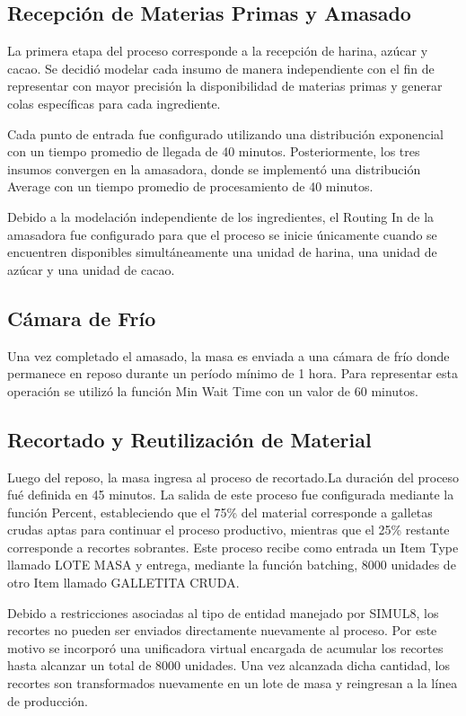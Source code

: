 \documentclass[runningheads]{llncs}
\begin{document}
\subsection{Recepción de Materias Primas y Amasado}

La primera etapa del proceso corresponde a la recepción de harina, azúcar y cacao. Se decidió modelar cada insumo de manera independiente con el fin de representar con mayor precisión la disponibilidad de materias primas y generar colas específicas para cada ingrediente.

Cada punto de entrada fue configurado utilizando una distribución exponencial con un tiempo promedio de llegada de 40 minutos. Posteriormente, los tres insumos convergen en la amasadora, donde se implementó una distribución Average con un tiempo promedio de procesamiento de 40 minutos.

Debido a la modelación independiente de los ingredientes, el Routing In de la amasadora fue configurado para que el proceso se inicie únicamente cuando se encuentren disponibles simultáneamente una unidad de harina, una unidad de azúcar y una unidad de cacao. 

\subsection{Cámara de Frío}

Una vez completado el amasado, la masa es enviada a una cámara de frío donde permanece en reposo durante un período mínimo de 1 hora. Para representar esta operación se utilizó la función Min Wait Time con un valor de 60 minutos.

\subsection{Recortado y Reutilización de Material}

Luego del reposo, la masa ingresa al proceso de recortado.La duración del proceso fué definida en 45 minutos. La salida de este proceso fue configurada mediante la función Percent, estableciendo que el 75\% del material corresponde a galletas crudas aptas para continuar el proceso productivo, mientras que el 25\% restante corresponde a recortes sobrantes. Este proceso recibe como entrada un Item Type llamado LOTE MASA y entrega, mediante la función batching, 8000 unidades de otro Item llamado GALLETITA CRUDA.

Debido a restricciones asociadas al tipo de entidad manejado por SIMUL8, los recortes no pueden ser enviados directamente nuevamente al proceso. Por este motivo se incorporó una unificadora virtual encargada de acumular los recortes hasta alcanzar un total de 8000 unidades. Una vez alcanzada dicha cantidad, los recortes son transformados nuevamente en un lote de masa y reingresan a la línea de producción.
\end{document}
